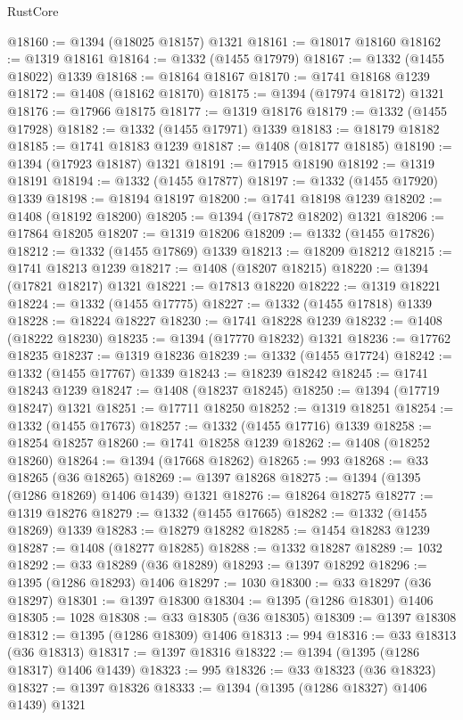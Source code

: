 \begin{lexlean}{RustCore}
\begin{coremodule}
@18160 := @1394 (@18025 @18157) @1321
@18161 := @18017 @18160
@18162 := @1319 @18161
@18164 := @1332 (@1455 @17979)
@18167 := @1332 (@1455 @18022) @1339
@18168 := @18164 @18167
@18170 := @1741 @18168 @1239
@18172 := @1408 (@18162 @18170)
@18175 := @1394 (@17974 @18172) @1321
@18176 := @17966 @18175
@18177 := @1319 @18176
@18179 := @1332 (@1455 @17928)
@18182 := @1332 (@1455 @17971) @1339
@18183 := @18179 @18182
@18185 := @1741 @18183 @1239
@18187 := @1408 (@18177 @18185)
@18190 := @1394 (@17923 @18187) @1321
@18191 := @17915 @18190
@18192 := @1319 @18191
@18194 := @1332 (@1455 @17877)
@18197 := @1332 (@1455 @17920) @1339
@18198 := @18194 @18197
@18200 := @1741 @18198 @1239
@18202 := @1408 (@18192 @18200)
@18205 := @1394 (@17872 @18202) @1321
@18206 := @17864 @18205
@18207 := @1319 @18206
@18209 := @1332 (@1455 @17826)
@18212 := @1332 (@1455 @17869) @1339
@18213 := @18209 @18212
@18215 := @1741 @18213 @1239
@18217 := @1408 (@18207 @18215)
@18220 := @1394 (@17821 @18217) @1321
@18221 := @17813 @18220
@18222 := @1319 @18221
@18224 := @1332 (@1455 @17775)
@18227 := @1332 (@1455 @17818) @1339
@18228 := @18224 @18227
@18230 := @1741 @18228 @1239
@18232 := @1408 (@18222 @18230)
@18235 := @1394 (@17770 @18232) @1321
@18236 := @17762 @18235
@18237 := @1319 @18236
@18239 := @1332 (@1455 @17724)
@18242 := @1332 (@1455 @17767) @1339
@18243 := @18239 @18242
@18245 := @1741 @18243 @1239
@18247 := @1408 (@18237 @18245)
@18250 := @1394 (@17719 @18247) @1321
@18251 := @17711 @18250
@18252 := @1319 @18251
@18254 := @1332 (@1455 @17673)
@18257 := @1332 (@1455 @17716) @1339
@18258 := @18254 @18257
@18260 := @1741 @18258 @1239
@18262 := @1408 (@18252 @18260)
@18264 := @1394 (@17668 @18262)
@18265 := 993
@18268 := @33 @18265 (@36 @18265)
@18269 := @1397 @18268
@18275 := @1394 (@1395 (@1286 @18269) @1406 @1439) @1321
@18276 := @18264 @18275
@18277 := @1319 @18276
@18279 := @1332 (@1455 @17665)
@18282 := @1332 (@1455 @18269) @1339
@18283 := @18279 @18282
@18285 := @1454 @18283 @1239
@18287 := @1408 (@18277 @18285)
@18288 := @1332 @18287
@18289 := 1032
@18292 := @33 @18289 (@36 @18289)
@18293 := @1397 @18292
@18296 := @1395 (@1286 @18293) @1406
@18297 := 1030
@18300 := @33 @18297 (@36 @18297)
@18301 := @1397 @18300
@18304 := @1395 (@1286 @18301) @1406
@18305 := 1028
@18308 := @33 @18305 (@36 @18305)
@18309 := @1397 @18308
@18312 := @1395 (@1286 @18309) @1406
@18313 := 994
@18316 := @33 @18313 (@36 @18313)
@18317 := @1397 @18316
@18322 := @1394 (@1395 (@1286 @18317) @1406 @1439)
@18323 := 995
@18326 := @33 @18323 (@36 @18323)
@18327 := @1397 @18326
@18333 := @1394 (@1395 (@1286 @18327) @1406 @1439) @1321

\end{coremodule}
\end{lexlean}
